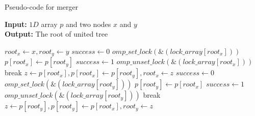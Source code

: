 \begin{algorithm}[ht!]
\small
{
	\caption{Pseudo-code for merger\cite{Patwary2012_PARemSP}}
	\label{alg:merger}
	\textbf{Input:} $1D$ array $p$ and two nodes $x$ and $y$ \\
	\textbf{Output:} The root of united tree 
	\begin{algorithmic}[1]
		\State $root_x \gets x, root_y \gets y$
					\State $success \gets 0$
					\State $omp\_set\_lock(\&(lock\_array[root_x]))$
						\State $p[root_x] \gets p[root_y]$
						\State $success \gets 1$
					\EndIf
					\State $omp\_unset\_lock(\&(lock\_array[root_x]))$
						\State break
					\EndIf
				\EndIf
				\State $z \gets p[root_x], p[root_x] \gets p[root_y], root_x \gets z$
			\Else
					\State $success \gets 0$
					\State $omp\_set\_lock(\&(lock\_array[root_y]))$
						\State $p[root_y] \gets p[root_x]$
						\State $success \gets 1$
					\EndIf
					\State $omp\_unset\_lock(\&(lock\_array[root_y]))$
						\State break
					\EndIf
				\EndIf
				\State $z \gets p[root_y], p[root_y] \gets p[root_x], root_y \gets z$
			\EndIf
		\EndWhile
		\State {}
	\EndFunction
	\end{algorithmic}	
}
\end{algorithm}
